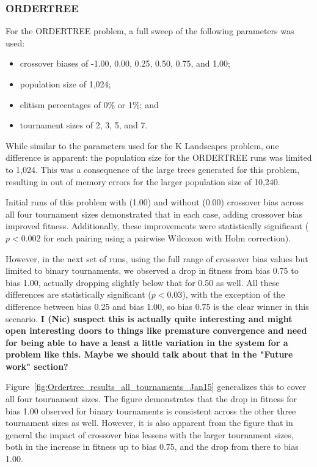 \documentclass{sig-alternate}
\begin{document}
\subsubsection{ORDERTREE}

For the ORDERTREE problem, a full sweep of the following parameters was used:

\begin{itemize}
	\item crossover biases of -1.00, 0.00, 0.25, 0.50, 0.75, and 1.00;
	\item population size of 1,024;
	\item elitism percentages of 0\% or 1\%; and
	\item tournament sizes of 2, 3, 5, and 7.
\end{itemize}

While similar to the parameters used for the K Landscapes problem, one difference is apparent: the population size for
the ORDERTREE runs was limited to 1,024. This was a consequence of the large trees generated for this problem,
resulting in out of memory errors for the larger population size of 10,240.

Initial runs of this problem with (1.00) and without (0.00) crossover bias across all four tournament sizes
demonstrated that in each case, adding crossover bias improved fitness. Additionally, these improvements were
statistically significant ($p < 0.002$ for each pairing using a pairwise Wilcoxon with Holm correction).

However, in the next set of runs, using the full range of crossover bias values but limited to binary tournaments, we
observed a drop in fitness from bias 0.75 to bias 1.00, actually dropping slightly below that for 0.50 as well. All
these differences are statistically significant ($p < 0.03$), with the exception of the difference between bias 0.25
and bias 1.00, so bias 0.75 is the clear winner in this scenario. \textbf{I (Nic) suspect this is actually quite
interesting and might open interesting doors to things like premature convergence and need for being able to have a
least a little variation in the system for a problem like this. Maybe we should talk about that in the "Future work"
section?}

Figure~\ref{fig:Ordertree_results_all_tournaments_Jan15} generalizes this to cover all four tournament sizes. The
figure demonstrates that the drop in fitness for bias 1.00 observed for binary tournaments is consistent across the
other three tournament sizes as well. However, it is also apparent from the figure that in general the impact of
crossover bias lessens with the larger tournament sizes, both in the increase in fitness up to bias 0.75, and the drop
from there to bias 1.00.
\end{document}
